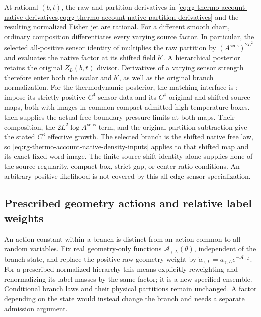 At rational $(b,t)$, the raw and partition derivatives in
\cref{eq:rg-thermo-account-native-derivatives,eq:rg-thermo-account-native-partition-derivatives}
and the resulting normalized Fisher jet are rational. For a different
smooth chart, ordinary composition differentiates every varying source
factor. In particular, the selected all-positive sensor identity of
 multiplies the raw partition by
$(A^{\mathrm{sens}})^{2L^2}$ and evaluates the native factor at its
shifted field $b'$. A hierarchical posterior retains the original
$Z_L(b,t)$ divisor. Derivatives of a varying sensor strength therefore
enter both the scalar and $b'$, as well as the original branch
normalization. For the thermodynamic posterior, the matching interface
is : impose its strictly
positive $C^4$ sensor data and its $C^4$ original and shifted source
maps, both with images in common compact admitted high-temperature
boxes.  then supplies the
actual free-boundary pressure limits at both maps. Their composition,
the $2L^2\log A^{\mathrm{sens}}$ term, and the original-partition
subtraction give the stated $C^3$ effective growth. The selected branch
is the shifted native free law, so
\cref{eq:rg-thermo-account-native-density-inputs} applies to that
shifted map and its exact fixed-word image. The finite source-shift
identity alone supplies none of the source regularity, compact-box,
strict-gap, or center-ratio conditions. An arbitrary positive likelihood
is not covered by this all-edge sensor specialization.\thermoestablishedstatus

\subsection{Prescribed geometry actions and relative label weights}
\label{sec:rg-thermo-account-actions}

An action constant within a branch is distinct from an action common to
all random variables. Fix real geometry-only functions
$\mathscr A_{\gamma,L}(\theta)$, independent of the branch state, and
replace the positive raw geometry weight by
$\widetilde a_{\gamma,L}=a_{\gamma,L}e^{-\mathscr A_{\gamma,L}}$.
For a prescribed normalized hierarchy this means explicitly reweighting
and renormalizing its label masses by the same factor; it is a new
specified ensemble. Conditional branch laws and their physical partitions
remain unchanged. A factor depending on the state would instead change
the branch and needs a separate admission argument.\thermoestablishedstatus


